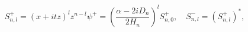 \begin{equation}
S_{n,l}^+=(x+itz)^lz^{n-l}\psi^+=\left(\frac{\alpha-2iD_n}{2
H_n}
\right)^lS^+_{n,0},
\quad S^-_{n,l}=(S^+_{n,l})^*,
\label{szt}
\end{equation}

